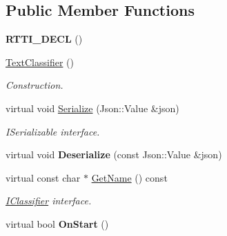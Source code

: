 \subsection*{Public Member Functions}
\begin{DoxyCompactItemize}
\item 
\mbox{\label{class_text_classifier_a220fadcad0b306f8a0c9dc2d482f8909}} 
{\bfseries R\+T\+T\+I\+\_\+\+D\+E\+CL} ()
\item 
\mbox{\label{class_text_classifier_a7d157536ba39ce2fbc54df2378cff3af}} 
\hyperlink{class_text_classifier_a7d157536ba39ce2fbc54df2378cff3af}{Text\+Classifier} ()
\begin{DoxyCompactList}\small\item\em Construction. \end{DoxyCompactList}\item 
\mbox{\label{class_text_classifier_abe1413e8b5b72ba992d9e3b245125d8b}} 
virtual void \hyperlink{class_text_classifier_abe1413e8b5b72ba992d9e3b245125d8b}{Serialize} (Json\+::\+Value \&json)
\begin{DoxyCompactList}\small\item\em I\+Serializable interface. \end{DoxyCompactList}\item 
\mbox{\label{class_text_classifier_a1591cd9a127f75847d6c75d22a27937a}} 
virtual void {\bfseries Deserialize} (const Json\+::\+Value \&json)
\item 
\mbox{\label{class_text_classifier_ab1229dd3b382ebb325824153adad3b87}} 
virtual const char $\ast$ \hyperlink{class_text_classifier_ab1229dd3b382ebb325824153adad3b87}{Get\+Name} () const
\begin{DoxyCompactList}\small\item\em \hyperlink{class_i_classifier}{I\+Classifier} interface. \end{DoxyCompactList}\item 
\mbox{\label{class_text_classifier_ae4c2181b19ee9271ff1813ae06f61199}} 
virtual bool {\bfseries On\+Start} ()
\item 
\mbox{\label{class_text_classifier_ae3f049231d88737bf57be8712054a0c1}} 

\end{DoxyCompactItemize}
